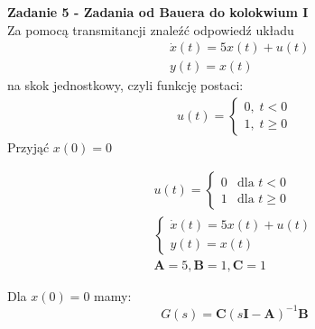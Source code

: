 \documentclass[a4paper,11pt]{article}
\begin{document}
\newpage
\begin{framed}
\textbf{Zadanie 5 - Zadania od Bauera do kolokwium I} \\ 
Za pomocą transmitancji znaleźć odpowiedź układu
\begin{align*}
&\dot{x}(t)=5x(t)+u(t) \\
&y(t) = x(t)
\end{align*}
na skok jednostkowy, czyli funkcję postaci: 
\begin{align*}
u(t) =
\begin{cases}
0, \; t < 0 \\
1, \; t \geq 0
\end{cases}
\end{align*}
Przyjąć \( x(0) = 0 \)
\end{framed}

\begin{gather*}
u(t) = \begin{cases}
0 & \text{dla } t < 0 \\
1 & \text{dla } t \geqslant  0
\end{cases} \\
\begin{cases}
\dot{x}(t) = 5x(t) + u(t) \\
y(t) = x(t)
\end{cases} \\
\mathbf{A} = 5, \mathbf{B} = 1, \mathbf{C} = 1
\end{gather*}

Dla $x(0) = 0$ mamy:
\[ G(s) = \mathbf{C} (s\mathbf{I} - \mathbf{A})^{-1} \mathbf{B} \]
\end{document}
